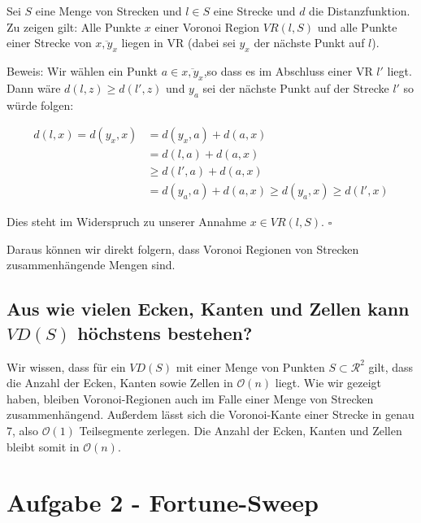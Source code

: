 \documentclass[a4paper]{article}
\begin{document}
Sei $S$ eine Menge von Strecken und $l \in S$ eine Strecke und $d$ die Distanzfunktion.
Zu zeigen gilt: Alle Punkte $x$ einer Voronoi Region  $VR(l, S)$ und alle Punkte einer Strecke von $\overline{x, y_x}$ liegen in VR (dabei sei $y_x$ der nächste Punkt auf $l$).

Beweis: Wir wählen ein Punkt $a \in \overline{x, y_x}$,so dass es im Abschluss einer VR $l'$ liegt. Dann wäre $d(l, z) \geq d(l', z)$ und $y_a$ sei der nächste Punkt auf der Strecke $l'$ so würde folgen:

\begin{align}
d(l,x)=d(y_x, x) &= d(y_x,a)+d(a, x)\\
&= d(l, a) +  d(a, x) \\
&\geq d(l', a) +  d(a, x) \\
&= d(y_a, a) +  d(a, x) \geq d(y_a, x) \geq d(l', x)
\end{align} 

Dies steht im Widerspruch zu unserer Annahme $x \in VR(l,S)$. $\square$ 

Daraus können wir direkt folgern, dass Voronoi Regionen von Strecken zusammenhängende Mengen sind.

\cite{Klein1997}


\subsection*{Aus wie vielen Ecken, Kanten und Zellen kann $VD(S)$ höchstens bestehen?}
Wir wissen, dass für ein $VD(S)$ mit einer Menge von Punkten $S \subset \mathcal{R}^2$ gilt, dass
die Anzahl der Ecken, Kanten sowie Zellen in $\mathcal{O}(n)$ liegt. 
Wie wir gezeigt haben, bleiben Voronoi-Regionen auch im Falle einer Menge von Strecken zusammenhängend.
Außerdem lässt sich die Voronoi-Kante einer Strecke in genau 7, also $\mathcal{O}(1)$ Teilsegmente zerlegen. Die Anzahl der Ecken, Kanten und Zellen bleibt somit in $\mathcal{O}(n)$.



\section*{Aufgabe 2 - Fortune-Sweep}
\end{document}

